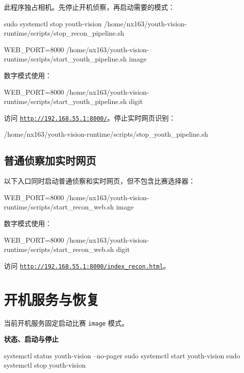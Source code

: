 \documentclass[11pt,a4paper]{article}
\begin{document}
此程序独占相机。先停止开机侦察，再启动需要的模式：

\begin{commandbox}
sudo systemctl stop youth-vision
/home/nx163/youth-vision-runtime/scripts/stop_recon_pipeline.sh

WEB_PORT=8000 /home/nx163/youth-vision-runtime/scripts/start_youth_pipeline.sh image
\end{commandbox}

数字模式使用：
\begin{commandbox}
WEB_PORT=8000 /home/nx163/youth-vision-runtime/scripts/start_youth_pipeline.sh digit
\end{commandbox}

访问 \href{http://192.168.55.1:8000/}{\texttt{http://192.168.55.1:8000/}}。停止实时网页识别：

\begin{commandbox}
/home/nx163/youth-vision-runtime/scripts/stop_youth_pipeline.sh
\end{commandbox}

\subsection{普通侦察加实时网页}

以下入口同时启动普通侦察和实时网页，但不包含比赛选择器：

\begin{commandbox}
WEB_PORT=8000 /home/nx163/youth-vision-runtime/scripts/start_recon_web.sh image
\end{commandbox}

数字模式使用：
\begin{commandbox}
WEB_PORT=8000 /home/nx163/youth-vision-runtime/scripts/start_recon_web.sh digit
\end{commandbox}

访问 \href{http://192.168.55.1:8000/index_recon.html}{\texttt{http://192.168.55.1:8000/index\_recon.html}}。

\Needspace{68mm}
\section{开机服务与恢复}

当前开机服务固定启动比赛 \texttt{image} 模式。

\textbf{状态、启动与停止}
\begin{commandbox}
systemctl status youth-vision --no-pager
sudo systemctl start youth-vision
sudo systemctl stop youth-vision
\end{commandbox}
\end{document}
